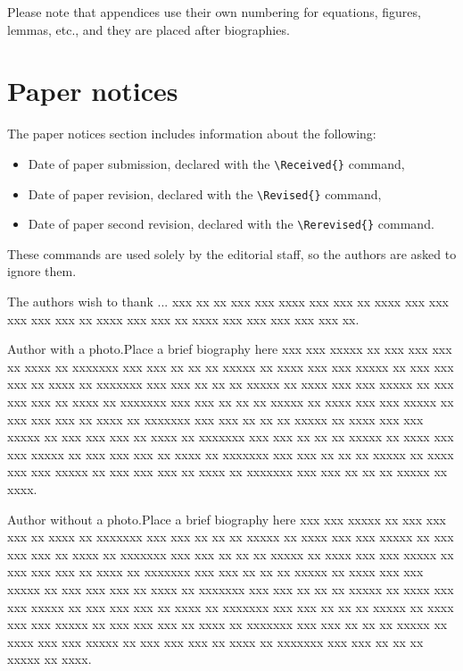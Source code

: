 \documentclass{amcs}
\begin{document}
Please note that appendices use their own numbering for equations, figures, lemmas, etc., and they are placed after biographies.

\section{Paper notices}
The paper notices section includes information about the following:
\begin{itemize}
  \item
    Date of paper submission, declared with the \verb+\Received{}+ command,
  \item
    Date of paper revision, declared with the \verb+\Revised{}+ command,
  \item
    Date of paper second revision, declared with the \verb+\Rerevised{}+ command.
\end{itemize}
These commands are used solely by the editorial staff, so the authors are asked to ignore them.

\begin{acknowledgment}
The authors wish to thank ... xxx xx xx xxx xxx xxxx xxx xxx xx xxxx xxx xxx xxx xxx xxx xx
 xxxx xxx xxx xx xxxx xxx xxx xxx xxx xxx xx.
\end{acknowledgment}



\begin{biography}[photo]{Author with a photo.}Place a brief biography here xxx xxx xxxxx xx xxx xxx
xxx xx xxxx xx xxxxxxx xxx xxx xx xx xx xxxxx xx xxxx xxx xxx xxxxx xx xxx xxx
xxx xx xxxx xx xxxxxxx xxx xxx xx xx xx xxxxx xx xxxx xxx xxx xxxxx xx xxx xxx
xxx xx xxxx xx xxxxxxx xxx xxx xx xx xx xxxxx xx xxxx xxx xxx xxxxx xx xxx xxx
xxx xx xxxx xx xxxxxxx xxx xxx xx xx xx xxxxx xx xxxx xxx xxx xxxxx xx xxx xxx
xxx xx xxxx xx xxxxxxx xxx xxx xx xx xx xxxxx xx xxxx xxx xxx xxxxx xx xxx xxx
xxx xx xxxx xx xxxxxxx xxx xxx xx xx xx xxxxx xx xxxx xxx xxx xxxxx xx xxx xxx
xxx xx xxxx xx xxxxxxx xxx xxx xx xx xx xxxxx xx xxxx.
\end{biography}

\begin{biography}[]{Author without a photo.}Place a brief biography here xxx xxx xxxxx xx xxx xxx
xxx xx xxxx xx xxxxxxx xxx xxx xx xx xx xxxxx xx xxxx xxx xxx xxxxx xx xxx xxx
xxx xx xxxx xx xxxxxxx xxx xxx xx xx xx xxxxx xx xxxx xxx xxx xxxxx xx xxx xxx
xxx xx xxxx xx xxxxxxx xxx xxx xx xx xx xxxxx xx xxxx xxx xxx xxxxx xx xxx xxx
xxx xx xxxx xx xxxxxxx xxx xxx xx xx xx xxxxx xx xxxx xxx xxx xxxxx xx xxx xxx
xxx xx xxxx xx xxxxxxx xxx xxx xx xx xx xxxxx xx xxxx xxx xxx xxxxx xx xxx xxx
xxx xx xxxx xx xxxxxxx xxx xxx xx xx xx xxxxx xx xxxx xxx xxx xxxxx xx xxx xxx
xxx xx xxxx xx xxxxxxx xxx xxx xx xx xx xxxxx xx xxxx.
\end{biography}
\end{document}
